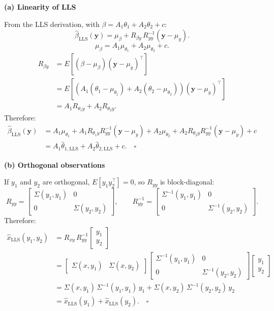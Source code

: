 \documentclass[12pt,a4paper,onecolumn]{exam}
\begin{document}
\begin{solution}

\textbf{(a) Linearity of LLS}

From the LLS derivation, with $\beta = A_1\theta_1 + A_2\theta_2 + c$:
\[
  \hat{\beta}_{\mathrm{LLS}}(\mathbf{y}) = \mu_\beta + R_{\beta y}\,R_{yy}^{-1}(\mathbf{y}-\mu_y).
\]
\[
  \mu_\beta = A_1\mu_{\theta_1} + A_2\mu_{\theta_2} + c.
\]
\begin{align*}
  R_{\beta y}
    &= E[(\beta-\mu_\beta)(\mathbf{y}-\mu_y)^\top] \\
    &= E\!\left[(A_1(\theta_1-\mu_{\theta_1}) + A_2(\theta_2-\mu_{\theta_2}))(\mathbf{y}-\mu_y)^\top\right] \\
    &= A_1 R_{\theta_1 y} + A_2 R_{\theta_2 y}.
\end{align*}
Therefore:
\begin{align*}
  \hat{\beta}_{\mathrm{LLS}}(\mathbf{y})
    &= A_1\mu_{\theta_1} + A_1 R_{\theta_1 y} R_{yy}^{-1}(\mathbf{y}-\mu_y)
     + A_2\mu_{\theta_2} + A_2 R_{\theta_2 y} R_{yy}^{-1}(\mathbf{y}-\mu_y) + c \\
    &= A_1\hat{\theta}_{1,\mathrm{LLS}} + A_2\hat{\theta}_{2,\mathrm{LLS}} + c. \quad\square
\end{align*}

\textbf{(b) Orthogonal observations}

If $y_1$ and $y_2$ are orthogonal, $E[y_1 y_2^\top] = 0$, so $R_{yy}$ is block-diagonal:
\[
  R_{yy} = \begin{bmatrix} \Sigma(y_1,y_1) & 0 \\ 0 & \Sigma(y_2,y_2) \end{bmatrix},
  \qquad
  R_{yy}^{-1} = \begin{bmatrix} \Sigma^{-1}(y_1,y_1) & 0 \\ 0 & \Sigma^{-1}(y_2,y_2) \end{bmatrix}.
\]
Therefore:
\begin{align*}
  \hat{x}_{\mathrm{LLS}}(y_1,y_2)
    &= R_{xy}\,R_{yy}^{-1}\begin{bmatrix}y_1\\y_2\end{bmatrix} \\
    &= \begin{bmatrix}\Sigma(x,y_1) & \Sigma(x,y_2)\end{bmatrix}
       \begin{bmatrix}\Sigma^{-1}(y_1,y_1) & 0 \\ 0 & \Sigma^{-1}(y_2,y_2)\end{bmatrix}
       \begin{bmatrix}y_1\\y_2\end{bmatrix} \\
    &= \Sigma(x,y_1)\,\Sigma^{-1}(y_1,y_1)\,y_1
     + \Sigma(x,y_2)\,\Sigma^{-1}(y_2,y_2)\,y_2 \\
    &= \hat{x}_{\mathrm{LLS}}(y_1) + \hat{x}_{\mathrm{LLS}}(y_2). \quad\square
\end{align*}

\end{solution}
\end{document}
